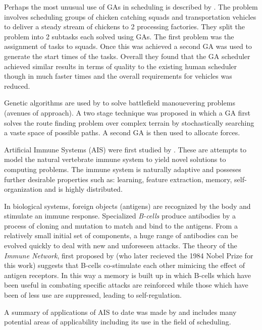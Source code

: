 Perhaps the most unusual use of GAs in scheduling is described by \citet{hart99chicken}. The problem involves scheduling groups of chicken catching squads and transportation vehicles to deliver a steady stream of chickens to 2 processing factories. They split the problem into 2 subtasks each solved using GAs. The first problem was the assignment of tasks to squads. Once this was achieved a second GA was used to generate the start times of the tasks. Overall they found that the GA scheduler achieved similar results in terms of quality to the existing human scheduler though in much faster times and the overall requirements for vehicles was reduced. 

Genetic algorithms are used by \citet{pernin08allocation} to solve battlefield manouevering problems (avenues of approach). A two stage technique was proposed in which a GA first solves the route finding problem over complex terrain by stochastically searching a vaste space of possible paths. A second GA is then used to allocate forces.



Artificial Immune Systems (AIS) were first studied by \citet{ishida90distributed}. These are attempts to model the natural vertebrate immune system to yield novel solutions to computing problems. The immune system is naturally adaptive and posseses further desirable properties such as: learning, feature extraction, memory, self-organization and is highly distributed.

In biological systems, foreign objects (antigens) are recognized by the body and stimulate an immune response. Specialized \emph{B-cells} produce antibodies by a process of cloning and mutation to match and bind to the antigens. From a relatively small initial set of components, a huge range of antibodies can be evolved quickly to deal with new and unforeseen attacks. The theory of the \emph{Immune Network}, first proposed by \citet{jerne74towards} (who later recieved the 1984 Nobel Prize \citep{jerne84generative} for this work) suggests that B-cells co-stimulate each other mimicing the effect of antigen receptors. In this way a memory is built up in which B-cells which have been useful in combating specific attacks are reinforced while those which have been of less use are suppressed, leading to self-regulation. 

A summary of applications of AIS to date was made by \citet{timmis04overview} and includes many potential areas of applicability including its use in the field of scheduling.


